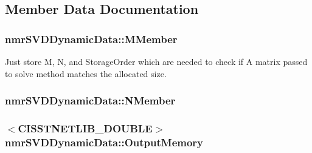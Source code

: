 \subsection{Member Data Documentation}
\hypertarget{classnmr_s_v_d_dynamic_data_a80e8b2828a7f24b24a6633bf6caa3ad4}{
\subsubsection[{M\-Member}]{ nmr\-S\-V\-D\-Dynamic\-Data\-::\-M\-Member\hspace{0.3cm}{\ttfamily [protected]}}}\label{classnmr_s_v_d_dynamic_data_a80e8b2828a7f24b24a6633bf6caa3ad4}
Just store M, N, and Storage\-Order which are needed to check if A matrix passed to solve method matches the allocated size. \hypertarget{classnmr_s_v_d_dynamic_data_a4096b80ce5ddda1a17c49c4565bf33db}{
\subsubsection[{N\-Member}]{ nmr\-S\-V\-D\-Dynamic\-Data\-::\-N\-Member\hspace{0.3cm}{\ttfamily [protected]}}}\label{classnmr_s_v_d_dynamic_data_a4096b80ce5ddda1a17c49c4565bf33db}
\hypertarget{classnmr_s_v_d_dynamic_data_a62cf889a1182a098e665a73f4985a9ba}{
\subsubsection[{Output\-Memory}]{$<$C\-I\-S\-S\-T\-N\-E\-T\-L\-I\-B\-\_\-\-D\-O\-U\-B\-L\-E$>$ nmr\-S\-V\-D\-Dynamic\-Data\-::\-Output\-Memory\hspace{0.3cm}{\ttfamily [protected]}}}\label{classnmr_s_v_d_dynamic_data_a62cf889a1182a098e665a73f4985a9ba}
